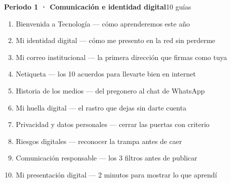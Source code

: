 
\bigskip
{}
\vspace{1pt}\par\noindent{\color{vinoInst}\rule{\textwidth}{1pt}}
\vspace{3pt}

\noindent\textbf{Periodo 1 · Comunicación e identidad digital}\hfill{\footnotesize\color{vinoInst}10 guías}\par
\begin{enumerate}[leftmargin=2.6em, itemsep=0.6pt, topsep=2pt, parsep=0pt, label=\footnotesize\arabic*.]
\footnotesize
  \item Bienvenida a Tecnología --- cómo aprenderemos este año
  \item Mi identidad digital --- cómo me presento en la red sin perderme
  \item Mi correo institucional --- la primera dirección que firmas como tuya
  \item Netiqueta --- los 10 acuerdos para llevarte bien en internet
  \item Historia de los medios --- del pregonero al chat de WhatsApp
  \item Mi huella digital --- el rastro que dejas sin darte cuenta
  \item Privacidad y datos personales --- cerrar las puertas con criterio
  \item Riesgos digitales --- reconocer la trampa antes de caer
  \item Comunicación responsable --- los 3 filtros antes de publicar
  \item Mi presentación digital --- 2 minutos para mostrar lo que aprendí
\end{enumerate}

